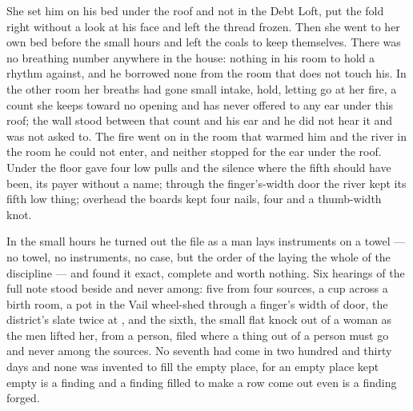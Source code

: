 She set him on his bed under the roof and not in the Debt Loft, put the fold right without a look at his face and left the thread frozen. Then she went to her own bed before the small hours and left the coals to keep themselves. There was no breathing number anywhere in the house: nothing in his room to hold a rhythm against, and he borrowed none from the room that does not touch his. In the other room her breaths had gone small intake, hold, letting go at her fire, a count she keeps toward no opening and has never offered to any ear under this roof; the wall stood between that count and his ear and he did not hear it and was not asked to. The fire went on in the room that warmed him and the river in the room he could not enter, and neither stopped for the ear under the roof. Under the floor  gave four low pulls and the silence where the fifth should have been, its payer without a name; through the finger's-width door the river kept its fifth low thing; overhead the boards kept four nails, four and a thumb-width knot.

\scenebreak

In the small hours he turned out the file as a man lays instruments on a towel --- no towel, no instruments, no case, but the order of the laying the whole of the discipline --- and found it exact, complete and worth nothing. Six hearings of the full note stood beside and never among: five from four sources, a cup across a birth room, a pot in the Vail wheel-shed through a finger's width of door, the district's slate twice at , and the sixth, the small flat knock out of a woman as the men lifted her, from a person, filed where a thing out of a person must go and never among the sources. No seventh had come in two hundred and thirty days and none was invented to fill the empty place, for an empty place kept empty is a finding and a finding filled to make a row come out even is a finding forged.

